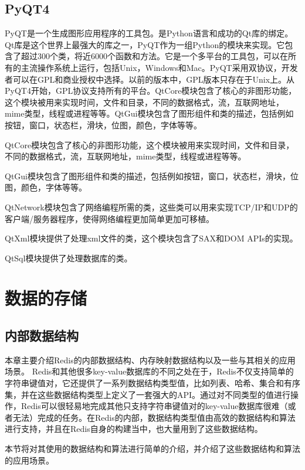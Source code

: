 \documentclass{zjutthesis}
\begin{document}
\section{PyQT4}
PyQT是一个生成图形应用程序的工具包。是Python\cite{hetland2008beginning}语言和成功的Qt库的绑定。Qt库是这个世界上最强大的库之一，PyQT作为一组Python的模块来实现。它包含了超过300个类，将近6000个函数和方法。它是一个多平台的工具包，可以在所有的主流操作系统上运行，包括Unix，Windows和Mac。PyQT采用双协议，开发者可以在GPL和商业授权中选择。以前的版本中，GPL版本只存在于Unix上。从PyQT4开始，GPL协议支持所有的平台。QtCore模块包含了核心的非图形功能，这个模块被用来实现时间，文件和目录，不同的数据格式，流，互联网地址，mime类型，线程或进程等等。QtGui模块包含了图形组件和类的描述，包括例如按钮，窗口，状态栏，滑块，位图，颜色，字体等等\cite{web:PyQT4}。

QtCore模块包含了核心的非图形功能，这个模块被用来实现时间，文件和目录，不同的数据格式，流，互联网地址，mime类型，线程或进程等等。

QtGui模块包含了图形组件和类的描述，包括例如按钮，窗口，状态栏，滑块，位图，颜色，字体等等。

QtNetwork模块包含了网络编程所需的类，这些类可以用来实现TCP/IP和UDP的客户端/服务器程序，使得网络编程更加简单更加可移植。

QtXml模块提供了处理xml文件的类，这个模块包含了SAX和DOM APIs的实现。

QtSql模块提供了处理数据库的类。


\chapter{数据的存储}
\section{内部数据结构}
本章主要介绍Redis的内部数据结构、内存映射数据结构以及一些与其相关的应用场景。
Redis和其他很多key-value数据库的不同之处在于，Redis不仅支持简单的字符串键值对，它还提供了一系列数据结构类型值，比如列表、哈希、集合和有序集，并在这些数据结构类型上定义了一套强大的API。通过对不同类型的值进行操作，Redis可以很轻易地完成其他只支持字符串键值对的key-value数据库很难（或者无法）完成的任务。在Redis的内部，数据结构类型值由高效的数据结构和算法进行支持，并且在Redis自身的构建当中，也大量用到了这些数据结构。

本节将对其使用的数据结构和算法进行简单的介绍，并介绍了这些数据结构和算法的应用场景。
\end{document}
